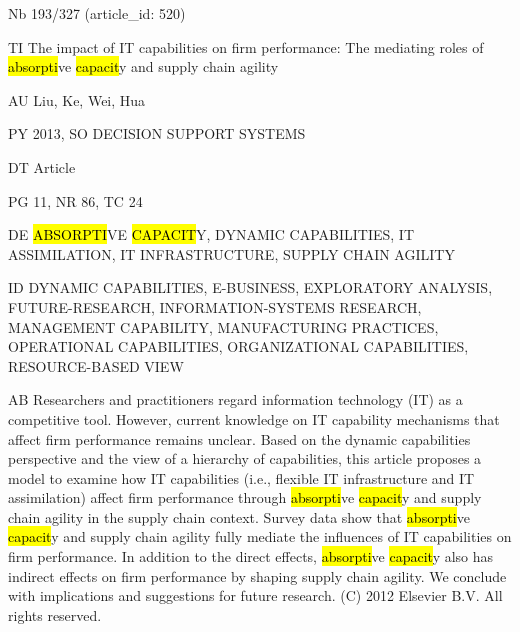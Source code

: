 \documentclass[a4paper]{article}
\begin{document}
\vspace*{-2cm}
Nb \tabto{0cm}193/327 (article\_id: 520)\par
TI \tabto{0cm}The impact of IT capabilities on firm performance: The mediating roles of \hl{absorpti}ve \hl{capacit}y and supply chain agility\par
AU \tabto{0cm}Liu, Ke, Wei, Hua\par
PY \tabto{0cm}2013, SO DECISION SUPPORT SYSTEMS\par
DT \tabto{0cm}Article\par
PG \tabto{0cm}11, NR 86, TC 24\par
DE \tabto{0cm}\hl{ABSORPTI}VE \hl{CAPACIT}Y, DYNAMIC CAPABILITIES, IT ASSIMILATION, IT INFRASTRUCTURE, SUPPLY CHAIN AGILITY\par
ID \tabto{0cm}DYNAMIC CAPABILITIES, E-BUSINESS, EXPLORATORY ANALYSIS, FUTURE-RESEARCH, INFORMATION-SYSTEMS RESEARCH, MANAGEMENT CAPABILITY, MANUFACTURING PRACTICES, OPERATIONAL CAPABILITIES, ORGANIZATIONAL CAPABILITIES, RESOURCE-BASED VIEW\par
AB \tabto{0cm}Researchers and practitioners regard information technology (IT) as a competitive tool. However, current knowledge on IT capability mechanisms that affect firm performance remains unclear. Based on the dynamic capabilities perspective and the view of a hierarchy of capabilities, this article proposes a model to examine how IT capabilities (i.e., flexible IT infrastructure and IT assimilation) affect firm performance through \hl{absorpti}ve \hl{capacit}y and supply chain agility in the supply chain context. Survey data show that \hl{absorpti}ve \hl{capacit}y and supply chain agility fully mediate the influences of IT capabilities on firm performance. In addition to the direct effects, \hl{absorpti}ve \hl{capacit}y also has indirect effects on firm performance by shaping supply chain agility. We conclude with implications and suggestions for future research. (C) 2012 Elsevier B.V. All rights reserved.\par
\clearpage
\end{document}
